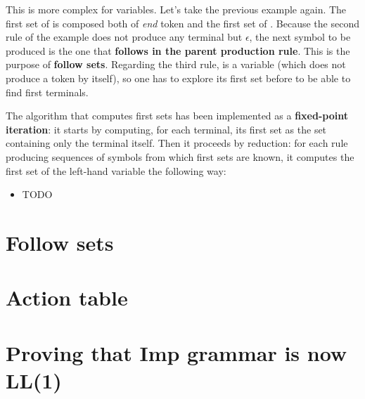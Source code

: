 This is more complex for variables. Let's take the previous example again. The first set of 
is composed both of \textit{end} token and the first set of . Because the second rule of the example
does not produce any terminal but $\epsilon$, the next symbol to be produced is the one that \textbf{follows in the parent production rule}.
This is the purpose of \textbf{follow sets}.
Regarding the third rule,  is a variable (which does not produce a token by itself), so one has to explore its first set
before to be able to find first terminals.

The algorithm that computes first sets has been implemented as a \textbf{fixed-point iteration}: it starts by computing, for each terminal, 
its first set as the set containing only the terminal itself. Then it proceeds by reduction: for each rule producing sequences of symbols
from which first sets are known, it computes the first set of the left-hand variable the following way:
\begin{itemize}
  \item TODO
\end{itemize}

\section{Follow sets}

\section{Action table}

\section{Proving that Imp grammar is now LL(1)}